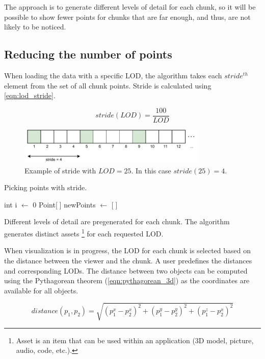 The approach is to generate different levels of detail for each chunk, so it will be possible to show fewer points for chunks that are far enough, and thus, are not likely to be noticed.

\subsection{Reducing the number of points}

When loading the data with a specific LOD, the algorithm takes each $stride^{th}$ element from the set of all chunk points. Stride is calculated using \autoref{eqn:lod_stride}.

\begin{equation}
\label{eqn:lod_stride}
stride(LOD) = \frac{100}{LOD}
\end{equation}

\begin{figure}[htb]
    \centering
    \includegraphics[width=0.8\textwidth]{lod-stride.pdf}
    \caption{Example of stride with $LOD = 25$. In this case $stride(25)=4$.}
    \label{fig:stride}
\end{figure}

\begin{algorithm}
    \caption{Picking points with stride.}
    
    int i $\gets$ 0\;
    Point[$\;$] newPoints $\gets$ [$\;$]\;
\end{algorithm}

Different levels of detail are pregenerated for each chunk. The algorithm generates distinct assets \footnote{Asset is an item that can be used within an application (3D model, picture, audio, code, etc.).} for each requested LOD.

When visualization is in progress, the LOD for each chunk is selected based on the distance between the viewer and the chunk. A user predefines the distances and corresponding LODs. The distance between two objects can be computed using the Pythagorean theorem (\autoref{eqn:pythagorean_3d}) as the coordinates are available for all objects.

\begin{equation}
\label{eqn:pythagorean_3d}
distance(p_1, p_2) = \sqrt{(p_1^x-p_2^x)^2 + (p_1^y-p_2^y)^2 + (p_1^z-p_2^x)^2}
\end{equation}

